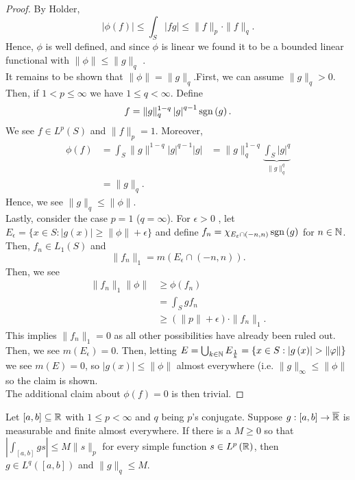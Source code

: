 \begin{proof}
	By Holder, \[
	\left|  \phi\left( f \right) 	\right|\le \int_{S}\left| fg \right| \le \|f\|_{p} \cdot \|f\|_{q}
	.\] Hence, \( \phi\) is well defined, and since \( \phi\) is linear we found it to be a bounded linear functional with \(\| \phi\| \le \| g\|_{q}\) .\\
	It remains to be shown that \(\| \phi\| = \|g\| _{q}\).First, we can assume \(\|g\|_{q}>0\). Then, if \(1 < p \le \infty\) we have \(1 \le q < \infty\). Define \[
	f = \|g\|_{q}^{1-q} \left| g \right| ^{q-1}\operatorname{sgn}\left( g \right)
	.\]
	We see \(f \in L^{p}\left( S \right) \) and \(\|f\|_{p} = 1\). Moreover, \begin{align*} \phi \left( f \right) &= \int_{S} \|g\|^{1-q} \left| g \right| ^{q-1} \left| g \right|
	&= \|g\|^{1-q}_{q} \underbrace{\int_{S} \left| g \right| ^{q}}_{\|g\|_{q}^{q}}  \\
&= \|g\|_{q}
	.\end{align*}
Hence, we see \(\|g\|_{q}\le \| \phi\|\).\\
Lastly, consider the case \(p = 1\) (\(q = \infty\)). For \(\epsilon > 0\) , let \(E_{\epsilon} = \{x \in S: \left| g\left( x \right)  \right| \ge \| \phi\| + \epsilon\} \) and define \(f_{n} = \chi_{E_{\varepsilon}\cap \left( -n, n \right) } \operatorname{sgn}\left( g \right) \) for \(n \in \mathbb{N}\). Then, \(f_{n} \in L_1\left( S \right) \) and \[
\|f_{n}\|_{1} = m\left( E_{\epsilon}\cap \left( -n, n \right)  \right)
.\]
Then, we see
\begin{align*}
	\|f_{n}\|_{1} \| \phi\| &\ge \phi\left( f_{n} \right) \\
	 &=  \int_{S}g f_{n} \\
				 &\ge  (\|p\| + \epsilon) \cdot \|f_{n}\|_{1}
.\end{align*}
This implies \(\|f_{n}\|_{1} = 0\) as all other possibilities have already been ruled out. Then, we see \(m\left( E_{\epsilon} \right) = 0 \). Then, letting \(E = \bigcup_{k \in \mathbb{N}} E_{\frac{1}{k}} = \{x \in S : \left| g\left( x \right)  \right| > \| \varphi\|\}  \) we see \(m\left( E \right)  = 0\), so \(\left| g\left( x \right)  \right| \le \| \phi\|\) almost everywhere (i.e. \(\|g\|_{\infty} \le \| \phi\|\) so the claim is shown.\\
The additional claim about \( \phi\left( f \right)  = 0\) is then trivial.
\end{proof}
\begin{lemma}
Let \(\left[ a, b \right] \subseteq \mathbb{R}\) 	with \(1 \le p < \infty\) and \(q\) being \(p\)'s conjugate. Suppose \(g: \left[ a, b \right]  \to \overline{\mathbb{R}}\) is measurable and finite almost everywhere. If there is a \(M \ge 0\) so that \(\left| \int_{\left[ a, b \right] } gs \right| \le M \|s\|_{p} \) for every simple function \(s \in L^{p}\left( \mathbb{R} \right) \), then \(g \in L^{q}\left( \left[ a, b \right]  \right) \) and \(\|g\|_{q}\le M\).
\end{lemma}
